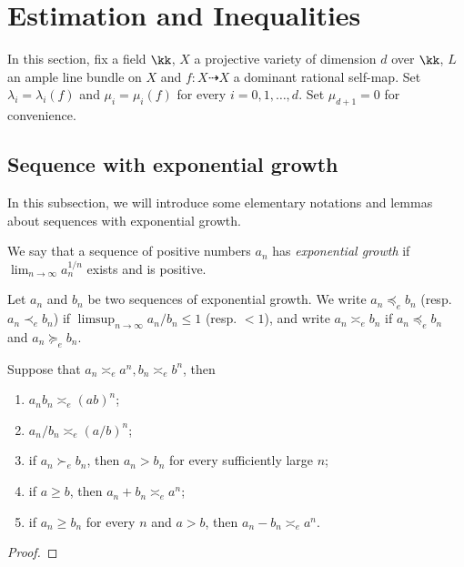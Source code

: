 \section{Estimation and Inequalities}

  In this section, fix a field $\kk$, $X$ a projective variety of dimension $d$ over $\kk$, $L$ an ample line bundle on $X$ and $f : X \dashrightarrow X$ a dominant rational self-map.
  Set $\lambda_i = \lambda_i(f)$ and $\mu_i = \mu_i(f)$ for every $i = 0, 1, \ldots, d$.
  Set $\mu_{d+1} = 0$ for convenience.


\subsection{Sequence with exponential growth}

  In this subsection, we will introduce some elementary notations and lemmas about sequences with exponential growth.

  \begin{definition}
    We say that a sequence of positive numbers $a_n$ has \emph{exponential growth} if $\lim_{n \to \infty} a_n^{1/n}$ exists and is positive.
  \end{definition}

  \begin{definition}
    Let $a_n$ and $b_n$ be two sequences of exponential growth.
    We write $a_n \preccurlyeq_e b_n$ (resp. $a_n \prec_e b_n$) if $\limsup_{n \to \infty} a_n/b_n \leq 1$ (resp. $<1$), and write $a_n \asymp_e b_n$ if $a_n \preccurlyeq_e b_n$ and $a_n \succcurlyeq_e b_n$.
  \end{definition}


  \begin{lemma}\label{lemma:elementary_inequalities}
    Suppose that $a_n \asymp_e a^n, b_n \asymp_e b^n$, then
    \begin{enumerate}
      \item $a_n b_n \asymp_e (ab)^n$;
      \item $a_n/b_n \asymp_e (a/b)^n$;
      \item if $a_n \succ_e b_n$, then $a_n > b_n$ for every sufficiently large $n$;
      \item if $a \geq b$, then $a_n + b_n \asymp_e a^n$;
      \item if $a_n \geq b_n$ for every $n$ and $a > b$, then $a_n - b_n \asymp_e a^n$.
    \end{enumerate}
  \end{lemma}
  \begin{proof}
    
  \end{proof}



